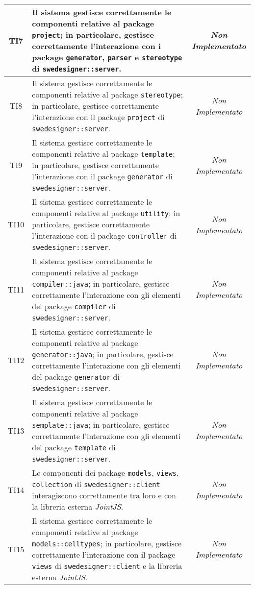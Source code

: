 \begin{longtable}{|c|>{}m{8cm}|c|}
\hypertarget{TI7}{TI7} & Il sistema gestisce correttamente le componenti relative al package \texttt{project}; in particolare, gestisce correttamente l'interazione con i package \texttt{generator}, \texttt{parser} e \texttt{stereotype} di \texttt{swedesigner::server}. & \textit{Non Implementato}\\ \hline
\hypertarget{TI8}{TI8} & Il sistema gestisce correttamente le componenti relative al package \texttt{stereotype}; in particolare, gestisce correttamente l'interazione con il package \texttt{project} di \texttt{swedesigner::server}. & \textit{Non Implementato}\\ \hline
\hypertarget{TI9}{TI9} & Il sistema gestisce correttamente le componenti relative al package \texttt{template}; in particolare, gestisce correttamente l'interazione con il package \texttt{generator} di \texttt{swedesigner::server}. & \textit{Non Implementato}\\ \hline
\hypertarget{TI10}{TI10} & Il sistema gestisce correttamente le componenti relative al package \texttt{utility}; in particolare, gestisce correttamente l'interazione con il package \texttt{controller} di \texttt{swedesigner::server}. & \textit{Non Implementato}\\ \hline
\hypertarget{TI11}{TI11} & Il sistema gestisce correttamente le componenti relative al package \texttt{compiler::java}; in particolare, gestisce correttamente l'interazione con gli elementi del package \texttt{compiler} di \texttt{swedesigner::server}. & \textit{Non Implementato}\\ \hline
\hypertarget{TI12}{TI12} & Il sistema gestisce correttamente le componenti relative al package \texttt{generator::java}; in particolare, gestisce correttamente l'interazione con gli elementi del package \texttt{generator} di \texttt{swedesigner::server}. & \textit{Non Implementato}\\ \hline
\hypertarget{TI13}{TI13} & Il sistema gestisce correttamente le componenti relative al package \texttt{semplate::java}; in particolare, gestisce correttamente l'interazione con gli elementi del package \texttt{template} di \texttt{swedesigner::server}. & \textit{Non Implementato}\\ \hline
\hypertarget{TI14}{TI14} & Le componenti dei package \texttt{models}, \texttt{views}, \texttt{collection} di \texttt{swedesigner::client} interagiscono correttamente tra loro e con la libreria esterna \emph{JointJS}. & \textit{Non Implementato}\\ \hline
\hypertarget{TI15}{TI15} & Il sistema gestisce correttamente le componenti relative al package \texttt{models::celltypes}; in particolare, gestisce correttamente l'interazione con il package \texttt{views} di \texttt{swedesigner::client} e la libreria esterna \emph{JointJS}. & \textit{Non Implementato}\\ \hline

\end{longtable}
